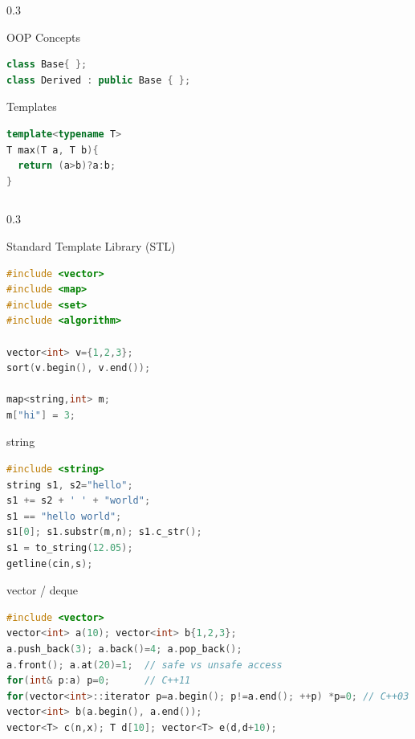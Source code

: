 \documentclass[final]{beamer}
\begin{document}
\begin{frame}[t,fragile]
\begin{columns}[t,totalwidth=0.95\paperwidth, colsep=0.05\paperwidth]
\begin{column}{0.3\paperwidth}
\begin{block}{OOP Concepts}
\begin{lstlisting}[language=C++]
class Base{ };
class Derived : public Base { };
\end{lstlisting}
\end{block}

\begin{block}{Templates}
\begin{lstlisting}[language=C++]
template<typename T>
T max(T a, T b){
  return (a>b)?a:b;
}
\end{lstlisting}
\end{block}
\end{column}
\end{columns}
\end{frame}
\begin{frame}[t,fragile]

\begin{columns}[t,totalwidth=0.9\paperwidth, colsep=0.015\paperwidth]

\begin{column}{0.3\paperwidth}
\
\begin{block}{Standard Template Library (STL)}
\begin{lstlisting}[language=C++]
#include <vector>
#include <map>
#include <set>
#include <algorithm>

vector<int> v={1,2,3};
sort(v.begin(), v.end());

map<string,int> m;
m["hi"] = 3;
\end{lstlisting}
\end{block}



\begin{block}{string}
\begin{lstlisting}[language=C++]
#include <string>
string s1, s2="hello";
s1 += s2 + ' ' + "world";
s1 == "hello world";
s1[0]; s1.substr(m,n); s1.c_str();
s1 = to_string(12.05);
getline(cin,s);
\end{lstlisting}
\end{block}

\begin{block}{vector / deque}
\begin{lstlisting}[language=C++]
#include <vector>
vector<int> a(10); vector<int> b{1,2,3};
a.push_back(3); a.back()=4; a.pop_back();
a.front(); a.at(20)=1;  // safe vs unsafe access
for(int& p:a) p=0;      // C++11
for(vector<int>::iterator p=a.begin(); p!=a.end(); ++p) *p=0; // C++03
vector<int> b(a.begin(), a.end());
vector<T> c(n,x); T d[10]; vector<T> e(d,d+10);


\end{lstlisting}
\end{block}
\end{column}
\end{columns}
\end{frame}
\end{document}
